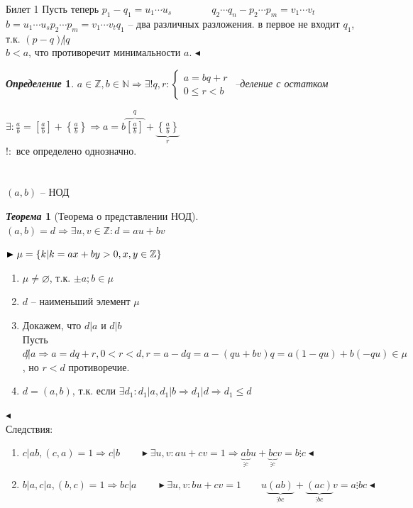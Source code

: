 \documentclass[a4paper,12pt]{article}
\newtheorem{deff}{\textit{Определение}}
\newtheorem{teo}{\textit{Теорема}}
\newcommand{\q}{\quad}
\newcommand{\pb}{\blacktriangleright}
\newcommand{\pe}{\blacktriangleleft}
\newcommand{\Ra}{\Rightarrow}
\newcommand{\bb}[1]{\mathbb{#1}}
\begin{document}
\begin{mybox}{\hypertarget{bil1}{Билет 1}}
Пусть теперь $p_1 - q_1 = u_1\cdots u_s\q\q\q\q q_2\cdots q_n - p_2\cdots p_m = v_1\cdots v_t$\\
$b = u_1\cdots u_s p_2\cdots p_m = v_1\cdots v_t q_1$ -- два различных разложения. в первое не входит $q_1$, т.к. $(p-q)\not|q$\\
$b < a$, что противоречит минимальности $a$.
 $\pe$\\
\begin{deff} $a\in \bb{Z}, b\in\bb{N}\Rightarrow \exists ! q,r: \begin{cases} a = bq+r\\0 \le r < b\end{cases} $ --деление с остатком
\end{deff}
$\exists: \frac{a}{b} = \left[\frac{a}{b}\right] + \left\{\frac{a}{b}\right\}\Rightarrow a = b\overbrace{\left[\frac{a}{b}\right]}^q + \underbrace{\left\{\frac{a}{b}\right\}}_r$\\
$!:$ все определено однозначно.\\\q\\\q\\
$(a,b)$ -- НОД\\
\begin{teo}[Теорема о представлении НОД]\q\\
$(a,b) = d \Ra \exists u,v\in\bb{Z}: d = au+bv$
\end{teo}
$\pb\\\mu = \{k|k=ax+by>0, x,y\in\bb{Z}\}$\\
\begin{enumerate}
\item $\mu \not= \varnothing$, т.к. $\pm a; b \in\mu$
\item $d$ -- наименьший элемент $\mu$
\item Докажем, что $d|a$ и $d|b$\\
Пусть $d\not|a \Ra a = dq+r, 0 < r < d, r = a - dq = a - (qu+bv)q = a(1-qu) + b(-qu)\in \mu$, но $r<d$  противоречие.\\
\item $d = (a,b)$, т.к. если $\exists d_1: d_1|a, d_1|b\Ra d_1|d\Ra d_1 \le d$
\end{enumerate}
$\pe$\\
Следствия:\\
\begin{enumerate}
    \item $c|ab, (c,a) = 1\Ra c|b\q\q \pb  \exists u,v: au+cv = 1\Ra \underbrace{ab}_{\vdots c}u + \underbrace{bc}_{\vdots c}v = b \vdots c   \pe$
    \item $b|a, c|a, (b,c) = 1\Ra bc|a\q\q    \pb  \exists u,v: bu+cv=1\q\q u\underbrace{(ab)}_{\vdots bc} + \underbrace{(ac)}_{\vdots bc}v = a \vdots bc  \pe$

\end{enumerate}
\end{mybox}
\end{document}
